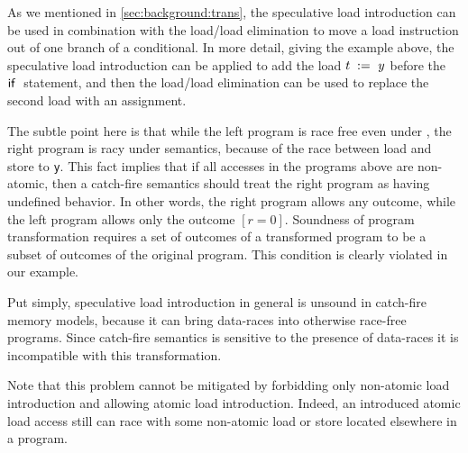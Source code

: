 As we mentioned in \cref{sec:background:trans}, 
the speculative load introduction can be used 
in combination with the load/load elimination 
to move a load instruction out of one branch of a conditional.
In more detail, giving the example above, 
the speculative load introduction can be applied
to add the load $t\;:=_{}\;y$ before the $\textsf{if}~$ statement, 
and then the load/load elimination can be used 
to replace the second load with an assignment. 

The subtle point here is that while the 
left program is race free even under \SC, 
the right program is racy under \SC semantics,
because of the race between load and store to \texttt{y}.
This fact implies that if all accesses in the programs above 
are non-atomic, then a catch-fire semantics should 
treat the right program as having undefined behavior.
In other words, the right program allows any outcome,
while the left program allows only the outcome ${[r=0]}$.
Soundness of program transformation requires 
a set of outcomes of a transformed program 
to be a subset of outcomes of the original program. 
This condition is clearly violated in our example. 

Put simply, speculative load introduction in general
is unsound in catch-fire memory models, 
because it can bring data-races into otherwise 
race-free programs. Since catch-fire semantics
is sensitive to the presence of data-races 
it is incompatible with this transformation. 

Note that this problem cannot be mitigated 
by forbidding only non-atomic load introduction
and allowing atomic load introduction. 
Indeed, an introduced atomic load access still 
can race with some non-atomic load or store
located elsewhere in a program.  
